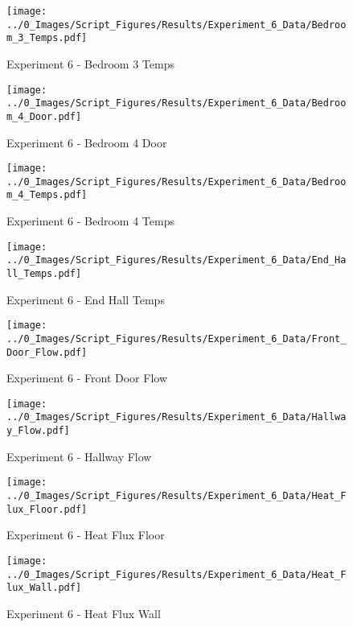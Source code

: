 	\begin{figure}[H]
		\centering
		\texttt{[image: ../0\_Images/Script\_Figures/Results/Experiment\_6\_Data/Bedroom\_3\_Temps.pdf]}
		\caption[]{Experiment 6 - Bedroom 3 Temps}
	\end{figure}
 
	\clearpage

	\begin{figure}[H]
		\centering
		\texttt{[image: ../0\_Images/Script\_Figures/Results/Experiment\_6\_Data/Bedroom\_4\_Door.pdf]}
		\caption[]{Experiment 6 - Bedroom 4 Door}
	\end{figure}
 

	\begin{figure}[H]
		\centering
		\texttt{[image: ../0\_Images/Script\_Figures/Results/Experiment\_6\_Data/Bedroom\_4\_Temps.pdf]}
		\caption[]{Experiment 6 - Bedroom 4 Temps}
	\end{figure}
 
	\clearpage

	\begin{figure}[H]
		\centering
		\texttt{[image: ../0\_Images/Script\_Figures/Results/Experiment\_6\_Data/End\_Hall\_Temps.pdf]}
		\caption[]{Experiment 6 - End Hall Temps}
	\end{figure}
 

	\begin{figure}[H]
		\centering
		\texttt{[image: ../0\_Images/Script\_Figures/Results/Experiment\_6\_Data/Front\_Door\_Flow.pdf]}
		\caption[]{Experiment 6 - Front Door Flow}
	\end{figure}
 
	\clearpage

	\begin{figure}[H]
		\centering
		\texttt{[image: ../0\_Images/Script\_Figures/Results/Experiment\_6\_Data/Hallway\_Flow.pdf]}
		\caption[]{Experiment 6 - Hallway Flow}
	\end{figure}
 

	\begin{figure}[H]
		\centering
		\texttt{[image: ../0\_Images/Script\_Figures/Results/Experiment\_6\_Data/Heat\_Flux\_Floor.pdf]}
		\caption[]{Experiment 6 - Heat Flux Floor}
	\end{figure}
 
	\clearpage

	\begin{figure}[H]
		\centering
		\texttt{[image: ../0\_Images/Script\_Figures/Results/Experiment\_6\_Data/Heat\_Flux\_Wall.pdf]}
		\caption[]{Experiment 6 - Heat Flux Wall}
	\end{figure}
 

